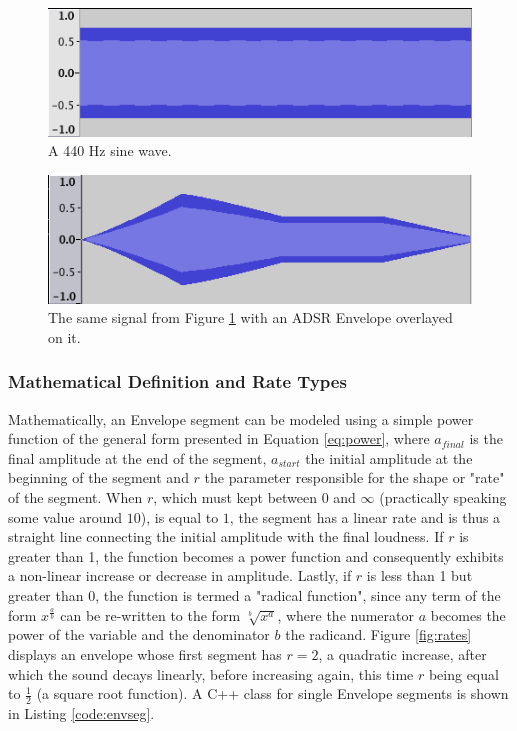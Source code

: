 \documentclass[12pt,twoside]{report}
\begin{document}
\begin{figure}[p!]
  \includegraphics[scale=0.8]{img/envb}
  \caption{A 440 Hz sine wave.}
  \label{fig:envb}
\end{figure}

\begin{figure}[p!]
  \includegraphics[scale=0.8]{img/enva}
  \caption{The same signal from Figure \ref{fig:envb} with an ADSR Envelope overlayed on it.}
  \label{fig:enva}
\end{figure}

\subsubsection{Mathematical Definition and Rate Types}

Mathematically, an Envelope segment can be modeled using a simple power function of the general form presented in Equation \ref{eq:power}, where $a_{final}$ is the final amplitude at the end of the segment, $a_{start}$ the initial amplitude at the beginning of the segment and $r$ the parameter responsible for the shape or "rate" of the segment. When $r$, which must kept between $0$ and $\infty$ (practically speaking some value around $10$), is equal to $1$, the segment has a linear rate and is thus a straight line connecting the initial amplitude with the final loudness. If $r$ is greater than 1, the function becomes a power function and consequently exhibits a non-linear increase or decrease in amplitude. Lastly, if $r$ is less than 1 but greater than 0, the function is termed a "radical function", since any term of the form $x^\frac{a}{b}$ can be re-written to the form $\sqrt[b]{x^a}$, where the numerator $a$ becomes the power of the variable and the denominator $b$ the radicand. Figure \ref{fig:rates} displays an envelope whose first segment has $r = 2$, a quadratic increase, after which the sound decays linearly, before increasing again, this time $r$ being equal to $\frac{1}{2}$ (a square root function). A C++ class for single Envelope segments is shown in Listing \ref{code:envseg}.
\end{document}
